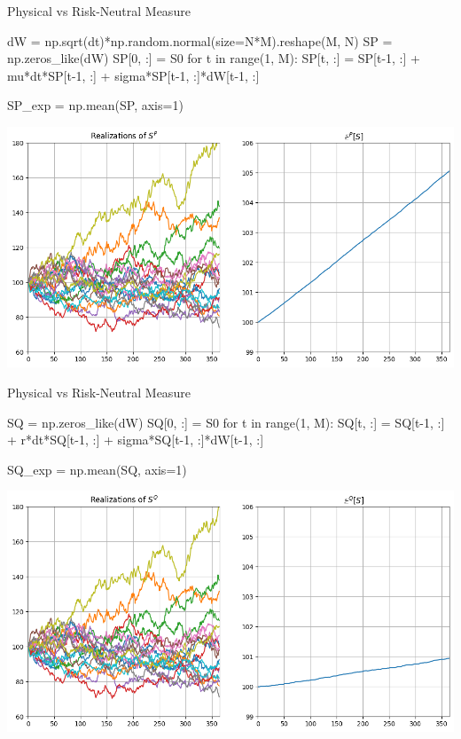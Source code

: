 \documentclass{beamer}
\begin{document}
\begin{frame}[fragile]{Physical vs Risk-Neutral Measure}
\begin{codebox}
\begin{ipython}[linewidth=0.7\linewidth]
dW = np.sqrt(dt)*np.random.normal(size=N*M).reshape(M, N)
SP = np.zeros_like(dW)
SP[0, :] = S0
for t in range(1, M):
    SP[t, :] = SP[t-1, :] + mu*dt*SP[t-1, :] + sigma*SP[t-1, :]*dW[t-1, :]

SP_exp = np.mean(SP, axis=1)
\end{ipython}
\end{codebox}
\begin{center}
\includegraphics[width=0.60\linewidth]{images/evolution_under_P}
\end{center}
\end{frame}

\begin{frame}[fragile]{Physical vs Risk-Neutral Measure}
	\begin{codebox}
		\begin{ipython}[linewidth=0.7\linewidth]
SQ = np.zeros_like(dW)
SQ[0, :] = S0
for t in range(1, M):
    SQ[t, :] = SQ[t-1, :] + r*dt*SQ[t-1, :] + sigma*SQ[t-1, :]*dW[t-1, :]

SQ_exp = np.mean(SQ, axis=1)
\end{ipython}
	\end{codebox}
	\begin{center}
		\includegraphics[width=0.60\linewidth]{images/evolution_under_Q}
	\end{center}
\end{frame}
\end{document}
